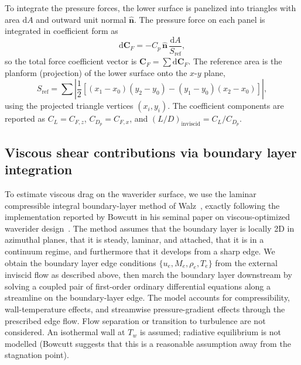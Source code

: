\documentclass[10pt,a4paper]{article}
\begin{document}
To integrate the pressure forces, the lower surface is panelized into triangles with area $\mathrm{d}A$ and outward unit normal $\hat{\mathbf{n}}$.  The pressure force on each panel is integrated in coefficient form as
\begin{equation}
    \mathrm{d}\mathbf{C}_F = -C_p\,\hat{\mathbf{n}}\,\frac{\mathrm{d}A}{S_{\mathrm{ref}}},
\end{equation}
so the total force coefficient vector is $\mathbf{C}_F = \sum \mathrm{d}\mathbf{C}_F$.  The reference area is the
planform (projection) of the lower surface onto the $x$-$y$ plane,
\begin{equation}
    S_{\mathrm{ref}} = \sum\!\left|\frac{1}{2}
    \left[(x_1-x_0)(y_2-y_0) - (y_1-y_0)(x_2-x_0)\right]\right|,
\end{equation}
using the projected triangle vertices $(x_i,y_i)$. The coefficient components are reported as $C_L = C_{F,z}$, $C_{D_p} = C_{F,x}$, and ${(L/D)}_\text{inviscid} = C_L/C_{D_p}$.

\subsection{Viscous shear contributions via boundary layer integration}
To estimate viscous drag on the waverider surface, we use the laminar compressible integral boundary-layer method of Walz~\cite{Walz:1969}, exactly following the implementation reported by Bowcutt in his seminal paper on viscous-optimized waverider design~\cite{Bowcutt:1986,Bowcutt:1987}. The method assumes that the boundary layer is locally 2D in azimuthal planes, that it is steady, laminar, and attached, that it is in a continuum regime, and furthermore that it develops from a sharp edge. We obtain the boundary layer edge conditions \(\{u_e, M_e, \rho_e, T_e\}\) from the external inviscid flow as described above, then march the boundary layer downstream by solving a coupled pair of first-order ordinary differential equations along a streamline on the boundary-layer edge. The model accounts for compressibility, wall-temperature effects, and streamwise pressure-gradient effects through the prescribed edge flow. Flow separation or transition to turbulence are not considered. An isothermal wall at $T_w$ is assumed; radiative equilibrium is not modelled (Bowcutt suggests that this is a reasonable assumption away from the stagnation point).
\end{document}
